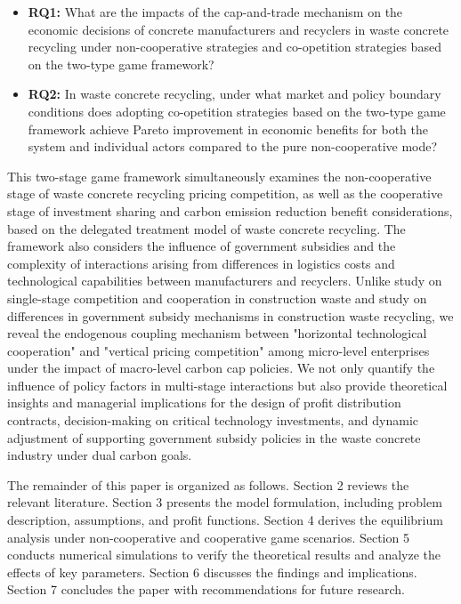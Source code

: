 \documentclass[authoryear,preprint,review,times,10pt]{elsarticle}
\begin{document}
\begin{itemize}
\item \textbf{RQ1:} What are the impacts of the cap-and-trade mechanism on the economic decisions of concrete manufacturers and recyclers in waste concrete recycling under non-cooperative strategies and co-opetition strategies based on the two-type game framework?
\item \textbf{RQ2:} In waste concrete recycling, under what market and policy boundary conditions does adopting co-opetition strategies based on the two-type game framework achieve Pareto improvement in economic benefits for both the system and individual actors compared to the pure non-cooperative mode?
\end{itemize}

This two-stage game framework simultaneously examines the non-cooperative stage of waste concrete recycling pricing competition, as well as the cooperative stage of investment sharing and carbon emission reduction benefit considerations, based on the delegated treatment model of waste concrete recycling. The framework also considers the influence of government subsidies and the complexity of interactions arising from differences in logistics costs and technological capabilities between manufacturers and recyclers. Unlike \cite{hu2021Dynamic} study on single-stage competition and cooperation in construction waste and \cite{yuan2023Differentiated} study on differences in government subsidy mechanisms in construction waste recycling, we reveal the endogenous coupling mechanism between "horizontal technological cooperation" and "vertical pricing competition" among micro-level enterprises under the impact of macro-level carbon cap policies. We not only quantify the influence of policy factors in multi-stage interactions but also provide theoretical insights and managerial implications for the design of profit distribution contracts, decision-making on critical technology investments, and dynamic adjustment of supporting government subsidy policies in the waste concrete industry under dual carbon goals.

The remainder of this paper is organized as follows. Section 2 reviews the relevant literature. Section 3 presents the model formulation, including problem description, assumptions, and profit functions. Section 4 derives the equilibrium analysis under non-cooperative and cooperative game scenarios. Section 5 conducts numerical simulations to verify the theoretical results and analyze the effects of key parameters. Section 6 discusses the findings and implications. Section 7 concludes the paper with recommendations for future research.
\end{document}
